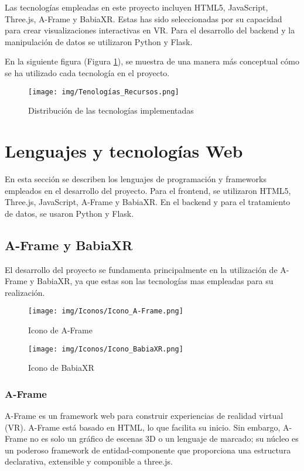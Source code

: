 \documentclass[a4paper, 12pt]{book}
\begin{document}
Las tecnologías empleadas en este proyecto incluyen HTML5, JavaScript, Three.js, A-Frame y BabiaXR. Estas has sido seleccionadas por su capacidad para crear visualizaciones interactivas en VR. Para el desarrollo del backend y la manipulación de datos se utilizaron Python y Flask.

En la siguiente figura (Figura \ref{fig:tecnologias}), se muestra de una manera más conceptual cómo se ha utilizado cada tecnología en el proyecto.

\begin{figure}[H]
  \centering
  \texttt{[image: img/Tenologías\_Recursos.png]}
  \caption{Distribución de las tecnologías implementadas}
  \label{fig:tecnologias}
\end{figure}


\section{Lenguajes y tecnologías Web}

En esta sección se describen los lenguajes de programación y frameworks empleados en el desarrollo del proyecto. Para el frontend, se utilizaron HTML5, Three.js, JavaScript, A-Frame y BabiaXR. En el backend y para el tratamiento de datos, se usaron Python y Flask.
    \subsection{A-Frame y BabiaXR}
    El desarrollo del proyecto se fundamenta principalmente en la utilización de A-Frame y BabiaXR, ya que estas son las tecnologías mas empleadas para su realización.
        \begin{figure}[H]
            \centering
            \begin{minipage}{0.45\textwidth}
                \centering
                \texttt{[image: img/Iconos/Icono\_A-Frame.png]}
                \caption{Icono de A-Frame}
                \label{fig:otra-imagen}
            \end{minipage}
            \begin{minipage}{0.45\textwidth}
                \centering
                \texttt{[image: img/Iconos/Icono\_BabiaXR.png]}
                \caption{Icono de BabiaXR}
                \label{fig:html-css-js}
            \end{minipage}\hfill
        \end{figure}
        \subsubsection{A-Frame}
        A-Frame es un framework web para construir experiencias de realidad virtual (VR). A-Frame está basado en HTML, lo que facilita su inicio. Sin embargo, A-Frame no es solo un gráfico de escenas 3D o un lenguaje de marcado; su núcleo es un poderoso framework de entidad-componente que proporciona una estructura declarativa, extensible y componible a three.js.\cite{AFrame}        
        
\end{document}
